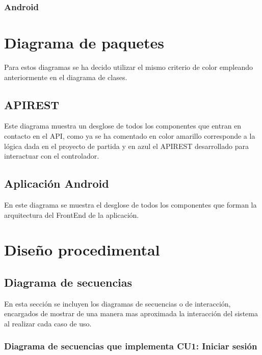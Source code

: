 

\subsubsection{Android}


\section{Diagrama de paquetes}

Para estos diagramas se ha decido utilizar el mismo criterio de color empleando anteriormente en el diagrama de clases.

\subsection{APIREST}

Este diagrama muestra un desglose de todos los componentes que entran en contacto en el API, como ya se ha comentado en color amarillo corresponde a la lógica dada en el proyecto de partida y en azul el APIREST desarrollado para interactuar con el controlador.


\subsection{Aplicación Android}

En este diagrama se muestra el desglose de todos los componentes que forman la arquitectura del FrontEnd de la aplicación.



\section{Diseño procedimental}

\subsection{Diagrama de secuencias}

En esta sección se incluyen los diagramas de secuencias o de interacción, encargados de mostrar de una manera mas aproximada la interacción del sistema al realizar cada caso de uso.

\subsubsection{Diagrama de secuencias que implementa CU1: Iniciar sesión}

